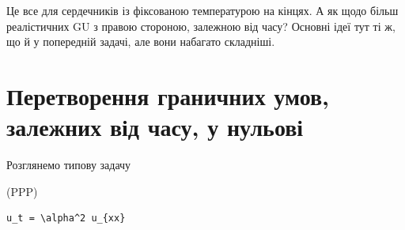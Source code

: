 \documentclass[
  ukrainian,
]{article}
\begin{document}
Це все для сердечників із фіксованою температурою на кінцях. А як щодо
більш реалістичних GU з правою стороною, залежною від часу? Основні ідеї
тут ті ж, що й у попередній задачі, але вони набагато складніші.

\section{Перетворення граничних умов, залежних від часу, у
нульові}\label{ux43fux435ux440ux435ux442ux432ux43eux440ux435ux43dux43dux44f-ux433ux440ux430ux43dux438ux447ux43dux438ux445-ux443ux43cux43eux432-ux437ux430ux43bux435ux436ux43dux438ux445-ux432ux456ux434-ux447ux430ux441ux443-ux443-ux43dux443ux43bux44cux43eux432ux456}

Розглянемо типову задачу

(PPP)

\begin{verbatim}
u_t = \alpha^2 u_{xx}
\end{verbatim}
\end{document}

